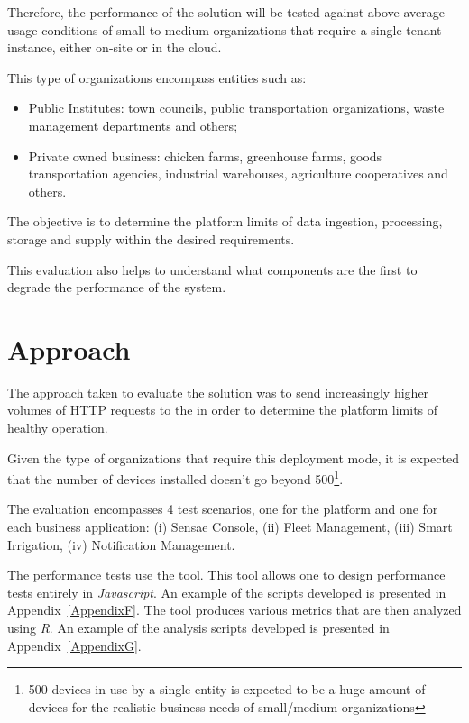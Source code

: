 Therefore, the performance of the solution will be tested against above-average usage conditions of small to medium organizations that require a single-tenant instance, either on-site or in the cloud.

This type of organizations encompass entities such as:

\begin{itemize}
    \item Public Institutes: town councils, public transportation organizations, waste management departments and others;
    \item Private owned business: chicken farms, greenhouse farms, goods transportation agencies, industrial warehouses, agriculture cooperatives and others.
\end{itemize}

The objective is to determine the platform limits of data ingestion, processing, storage and supply within the desired requirements.

This evaluation also helps to understand what components are the first to degrade the performance of the system.

\section{Approach}
\label{sec:evaluation:approach}

The approach taken to evaluate the solution was to send increasingly higher volumes of HTTP requests to the  in order to determine the platform limits of healthy operation.

Given the type of organizations that require this deployment mode, it is expected that the number of devices installed doesn't go beyond 500\footnote{500 devices in use by a single entity is expected to be a huge amount of devices for the realistic business needs of small/medium organizations}.

The evaluation encompasses 4 test scenarios, one for the platform and one for each business application: (i) Sensae Console, (ii) Fleet Management, (iii) Smart Irrigation, (iv) Notification Management.

The performance tests use the  tool. This tool allows one to design performance tests entirely in \textit{Javascript}. An example of the scripts developed is presented in Appendix~\ref{AppendixF}. The  tool produces various metrics that are then analyzed using \textit{R}. An example of the analysis scripts developed is presented in Appendix~\ref{AppendixG}.

